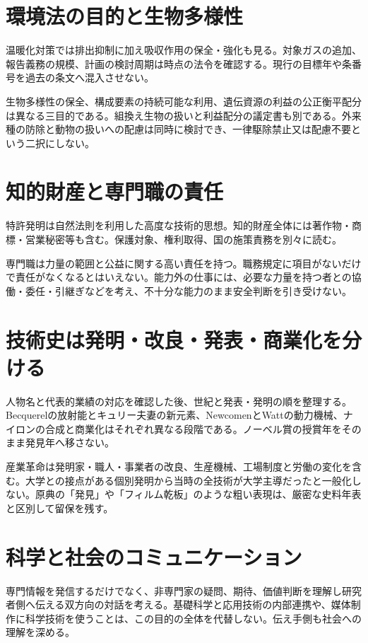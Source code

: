 \section{環境法の目的と生物多様性}
\label{theory:env:warminglaw}
\label{theory:env:biodiversity}
温暖化対策では排出抑制に加え吸収作用の保全・強化も見る。対象ガスの追加、報告義務の規模、計画の検討周期は時点の法令を確認する。現行の目標年や条番号を過去の条文へ混入させない。

生物多様性の保全、構成要素の持続可能な利用、遺伝資源の利益の公正衡平配分は異なる三目的である。組換え生物の扱いと利益配分の議定書も別である。外来種の防除と動物の扱いへの配慮は同時に検討でき、一律駆除禁止又は配慮不要という二択にしない。

\section{知的財産と専門職の責任}
\label{theory:env:ip}
\label{theory:env:ethics}
特許発明は自然法則を利用した高度な技術的思想。知的財産全体には著作物・商標・営業秘密等も含む。保護対象、権利取得、国の施策責務を別々に読む。\cite{ip_patent_statute,ip_broad_scope}

専門職は力量の範囲と公益に関する高い責任を持つ。職務規定に項目がないだけで責任がなくなるとはいえない。能力外の仕事には、必要な力量を持つ者との協働・委任・引継ぎなどを考え、不十分な能力のまま安全判断を引き受けない。\cite{ipej_ethics2011}

\section{技術史は発明・改良・発表・商業化を分ける}
\label{theory:env:historypairs}
\label{theory:env:historyorder}
\label{theory:env:industrial}
人物名と代表的業績の対応を確認した後、世紀と発表・発明の順を整理する。Becquerelの放射能とキュリー夫妻の新元素、NewcomenとWattの動力機械、ナイロンの合成と商業化はそれぞれ異なる段階である。ノーベル賞の授賞年をそのまま発見年へ移さない。\cite{env58_curie,env58_steam,env58_nylon}

産業革命は発明家・職人・事業者の改良、生産機械、工場制度と労働の変化を含む。大学との接点がある個別発明から当時の全技術が大学主導だったと一般化しない。原典の「発見」や「フィルム乾板」のような粗い表現は、厳密な史料年表と区別して留保を残す。

\section{科学と社会のコミュニケーション}
\label{theory:env:communication}
専門情報を発信するだけでなく、非専門家の疑問、期待、価値判断を理解し研究者側へ伝える双方向の対話を考える。基礎科学と応用技術の内部連携や、媒体制作に科学技術を使うことは、この目的の全体を代替しない。伝え手側も社会への理解を深める。\cite{env58_communication}
